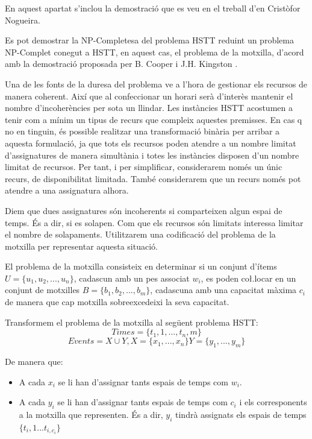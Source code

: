 \documentclass[11pt,a4paper,twoside]{report}
\begin{document}
    En aquest apartat s'inclou la demostració que es veu en el treball d'en Cristòfor Nogueira\cite{treballCristo}.
    
    Es pot demostrar la NP-Completesa del problema HSTT reduint un problema NP-Complet conegut a HSTT, en aquest cas, el problema de la motxilla\cite{wiki:bin}, d'acord amb la demostració proposada per B. Cooper i J.H. Kingston \cite{complexityHSTT}.

    Una de les fonts de la duresa del problema ve a l'hora de gestionar els recursos de manera coherent. Així que al confeccionar un horari serà d'interès mantenir el nombre d'incoherències per sota un llindar. 
    Les instàncies HSTT acostumen a tenir com a mínim un tipus de recurs que compleix aquestes premisses. 
    En cas q no en tinguin, és possible realitzar una transformació binària per arribar a aquesta formulació, 
    ja que tots els recursos poden atendre a un nombre limitat d'assignatures de manera simultània i totes les instàncies disposen d'un nombre limitat de recursos. Per tant, i per simplificar, considerarem només un únic recurs, de disponibilitat limitada. També considerarem que un recurs només pot atendre a una assignatura alhora.

    Diem que dues assignatures són incoherents si comparteixen algun espai de temps. És a dir, si es solapen. Com que els recursos són limitats interessa limitar el nombre de solapaments. Utilitzarem una codificació del problema de la motxilla per representar aquesta situació.

    El problema de la motxilla consisteix en determinar si un conjunt d'ítems $U = \{u_1, u_2, ..., u_n\}$, cadascun amb un pes associat $w_i$, es poden co\l.locar en un conjunt de motxilles $B = \{b_1, b_2, ..., b_m\}$, 
    cadascuna amb una capacitat màxima $c_i$ de manera que cap motxilla sobreexcedeixi la seva capacitat.

    Transformem el problema de la motxilla al següent problema HSTT: 
    \[
        Times = \{t_1,1, ..., t_n,m\}
    \]\[
        Events = X \cup Y, X = \{x_1, ..., x_n\} Y = \{y_1, ..., y_m\}
    \]

    De manera que: 
    \begin{itemize}
      \item A cada $x_i$ se li han d'assignar tants espais de temps com $w_i$.
      \item A cada $y_i$ se li han d'assignar tants espais de temps com $c_i$ i els corresponents a la motxilla que representen. És a dir, $y_i$ tindrà assignats els espais de temps $\{t_i,1 ... t_{i,c_i}\}$
    \end{itemize}
    
\end{document}
